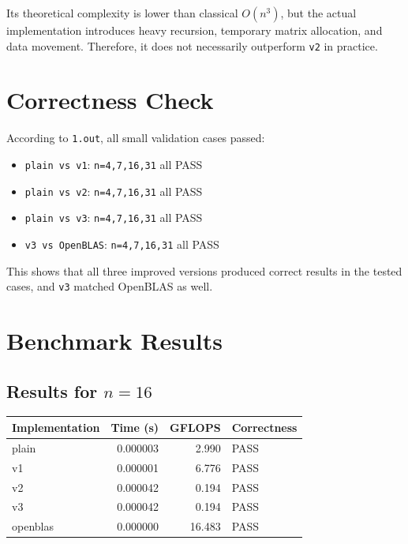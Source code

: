 \documentclass[11pt,a4paper]{article}
\begin{document}
Its theoretical complexity is lower than classical \(O(n^3)\), but the actual implementation introduces heavy recursion, temporary matrix allocation, and data movement. Therefore, it does not necessarily outperform \texttt{v2} in practice.

\section{Correctness Check}
According to \texttt{1.out}, all small validation cases passed:
\begin{itemize}
    \item \texttt{plain vs v1}: \texttt{n=4,7,16,31} all PASS
    \item \texttt{plain vs v2}: \texttt{n=4,7,16,31} all PASS
    \item \texttt{plain vs v3}: \texttt{n=4,7,16,31} all PASS
    \item \texttt{v3 vs OpenBLAS}: \texttt{n=4,7,16,31} all PASS
\end{itemize}

This shows that all three improved versions produced correct results in the tested cases, and \texttt{v3} matched OpenBLAS as well.

\section{Benchmark Results}
\subsection{Results for \(n = 16\)}
\begin{center}
\begin{tabular}{lrrl}
\toprule
Implementation & Time (s) & GFLOPS & Correctness \\
\midrule
plain    & 0.000003    & 2.990    & PASS \\
v1       & 0.000001    & 6.776    & PASS \\
v2       & 0.000042    & 0.194    & PASS \\
v3       & 0.000042    & 0.194    & PASS \\
openblas & 0.000000    & 16.483   & PASS \\
\bottomrule
\end{tabular}
\end{center}
\end{document}
